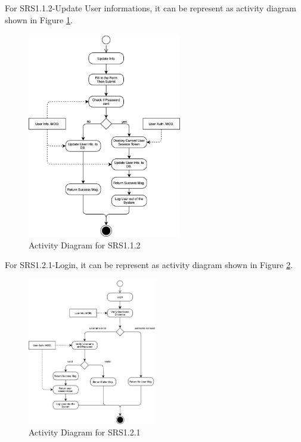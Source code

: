 For SRS1.1.2-Update User informations, it can be represent as activity diagram shown in Figure \ref{fig:srs_diagram_2}.

\begin{figure}[t]
	\centering
	\includegraphics[width=0.6\textwidth]{./img/srs_diagram_2.png}
	\caption{Activity Diagram for SRS1.1.2}
	\label{fig:srs_diagram_2}
\end{figure}

For SRS1.2.1-Login, it can be represent as activity diagram shown in Figure \ref{fig:srs_diagram_3}.

\begin{figure}[t]
	\centering
	\includegraphics[width=0.5\textwidth]{./img/srs_diagram_3.png}
	\caption{Activity Diagram for SRS1.2.1}

	\label{fig:srs_diagram_3}
\end{figure}


